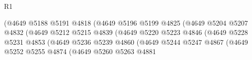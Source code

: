 \begin{lexlean}{R1}
\begin{coremodule}
                                                  (@4649
                                                    @5188
                                                    @5191
                                                    @4818
                                                    (@4649
                                                      @5196
                                                      @5199
                                                      @4825
                                                      (@4649
                                                        @5204
                                                        @5207
                                                        @4832
                                                        (@4649
                                                          @5212
                                                          @5215
                                                          @4839
                                                          (@4649
                                                            @5220
                                                            @5223
                                                            @4846
                                                            (@4649
                                                              @5228
                                                              @5231
                                                              @4853
                                                              (@4649
                                                                @5236
                                                                @5239
                                                                @4860
                                                                (@4649
                                                                  @5244
                                                                  @5247
                                                                  @4867
                                                                  (@4649
                                                                    @5252
                                                                    @5255
                                                                    @4874
                                                                    (@4649
                                                                      @5260
                                                                      @5263
                                                                      @4881

\end{coremodule}
\end{lexlean}
